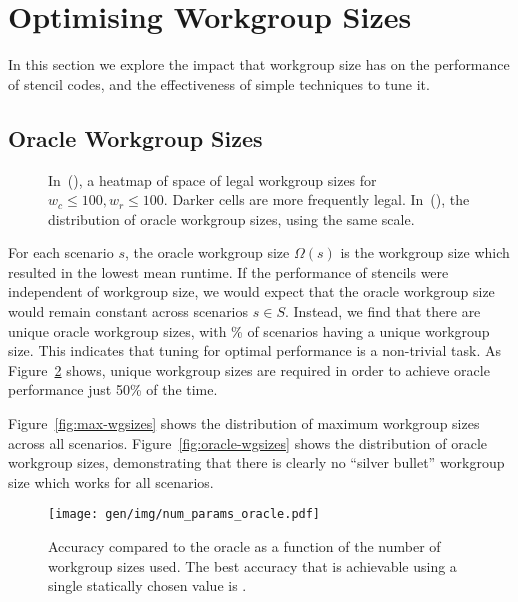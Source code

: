 

\section{Optimising Workgroup Sizes}

In this section we explore the impact that workgroup size has on the
performance of stencil codes, and the effectiveness of simple
techniques to tune it.

\subsection{Oracle Workgroup Sizes}


\begin{figure}

\caption{%
  In~(), a heatmap of space of legal workgroup
  sizes for $w_c \le 100, w_r \le 100$. Darker cells are more
  frequently legal. In~(), the distribution
  of oracle workgroup sizes, using the same scale.   %
}
\label{fig:heatmaps}
\end{figure}

For each scenario $s$, the oracle workgroup size $\Omega(s)$ is the
workgroup size which resulted in the lowest mean runtime. If the
performance of stencils were independent of workgroup size, we would
expect that the oracle workgroup size would remain constant across
scenarios $s \in S$. Instead, we find that there are
 unique oracle workgroup sizes, with
\% of scenarios having a
unique workgroup size. This indicates that tuning for optimal
performance is a non-trivial task. As Figure~\ref{fig:oracle-accuracy}
shows,  unique workgroup sizes are
required in order to achieve oracle performance just 50\% of the time.

Figure~\ref{fig:max-wgsizes} shows the distribution of maximum
workgroup sizes across all scenarios. Figure~\ref{fig:oracle-wgsizes}
shows the distribution of oracle workgroup sizes, demonstrating that
there is clearly no ``silver bullet'' workgroup size which works for
all scenarios.

\begin{figure}
\centering
\texttt{[image: gen/img/num\_params\_oracle.pdf]}
\caption{%
  Accuracy compared to the oracle as a function of the number of
  workgroup sizes used. The best accuracy that is achievable using a
  single statically chosen value is
  \protect.%
}
\label{fig:oracle-accuracy}
\end{figure}


